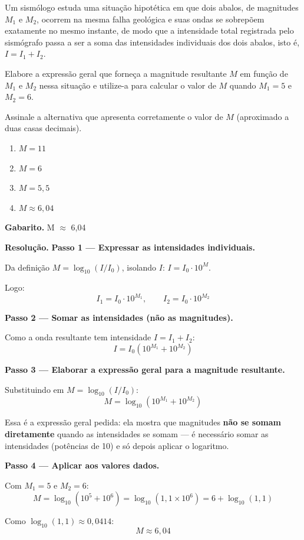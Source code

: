 \documentclass[11pt,a4paper]{article}
\begin{document}
Um sismólogo estuda uma situação hipotética em que dois abalos, de magnitudes $M_1$ e $M_2$, ocorrem na mesma falha geológica e suas ondas se sobrepõem exatamente no mesmo instante, de modo que a intensidade total registrada pelo sismógrafo passa a ser a soma das intensidades individuais dos dois abalos, isto é, $I = I_1 + I_2$.

Elabore a expressão geral que forneça a magnitude resultante $M$ em função de $M_1$ e $M_2$ nessa situação e utilize-a para calcular o valor de $M$ quando $M_1 = 5$ e $M_2 = 6$.

Assinale a alternativa que apresenta corretamente o valor de $M$ (aproximado a duas casas decimais).
\begin{enumerate}[label=(\alph*)]
\item $M = 11$
\item $M = 6$
\item $M = 5{,}5$
\item $M \approx 6{,}04$
\end{enumerate}

\textbf{Gabarito.} M $\approx$ 6,04

\textbf{Resolução.} \textbf{Passo 1 — Expressar as intensidades individuais.}

Da definição $M = \log_{10}(I/I_0)$, isolando $I$: $I = I_0 \cdot 10^{M}$.

Logo:
$$I_1 = I_0 \cdot 10^{M_1}, \qquad I_2 = I_0 \cdot 10^{M_2}$$

\textbf{Passo 2 — Somar as intensidades (não as magnitudes).}

Como a onda resultante tem intensidade $I = I_1 + I_2$:
$$I = I_0\left(10^{M_1} + 10^{M_2}\right)$$

\textbf{Passo 3 — Elaborar a expressão geral para a magnitude resultante.}

Substituindo em $M = \log_{10}(I/I_0)$:
$$M = \log_{10}\left(10^{M_1} + 10^{M_2}\right)$$

Essa é a expressão geral pedida: ela mostra que magnitudes \textbf{não se somam diretamente} quando as intensidades se somam — é necessário somar as intensidades (potências de 10) e só depois aplicar o logaritmo.

\textbf{Passo 4 — Aplicar aos valores dados.}

Com $M_1 = 5$ e $M_2 = 6$:
$$M = \log_{10}\left(10^{5} + 10^{6}\right) = \log_{10}(1{,}1 \times 10^{6}) = 6 + \log_{10}(1{,}1)$$

Como $\log_{10}(1{,}1) \approx 0{,}0414$:
$$M \approx 6{,}04$$
\end{document}
